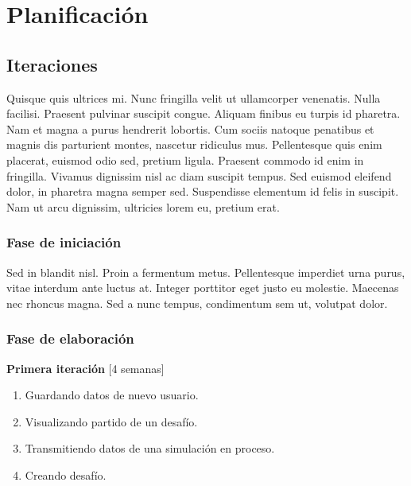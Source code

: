 \documentclass[a4paper, 10pt, twoside]{article}
\begin{document}
\newpage


\section{Planificación}

\subsection{Iteraciones}
Quisque quis ultrices mi. Nunc fringilla velit ut ullamcorper venenatis. Nulla facilisi. Praesent pulvinar suscipit congue. Aliquam finibus eu turpis id pharetra. Nam et magna a purus hendrerit lobortis. Cum sociis natoque penatibus et magnis dis parturient montes, nascetur ridiculus mus. Pellentesque quis enim placerat, euismod odio sed, pretium ligula. Praesent commodo id enim in fringilla. Vivamus dignissim nisl ac diam suscipit tempus. Sed euismod eleifend dolor, in pharetra magna semper sed. Suspendisse elementum id felis in suscipit. Nam ut arcu dignissim, ultricies lorem eu, pretium erat.

\subsubsection{Fase de iniciación}
Sed in blandit nisl. Proin a fermentum metus. Pellentesque imperdiet urna purus, vitae interdum ante luctus at. Integer porttitor eget justo eu molestie. Maecenas nec rhoncus magna. Sed a nunc tempus, condimentum sem ut, volutpat dolor.

\subsubsection{Fase de elaboración}

\textbf{Primera iteración} [4 semanas]
\begin{enumerate}
\item Guardando datos de nuevo usuario.
\item Visualizando partido de un desafío.
\item Transmitiendo datos de una simulación en proceso.
\item Creando desafío.
\end{enumerate}
\end{document}
